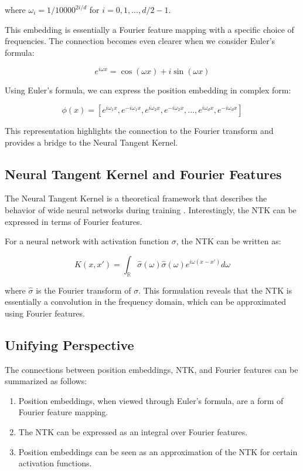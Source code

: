 \documentclass{article}
\begin{document}
where $\omega_i = 1/10000^{2i/d}$ for $i = 0, 1, ..., d/2 - 1$.

This embedding is essentially a Fourier feature mapping with a specific choice of frequencies. The connection becomes even clearer when we consider Euler's formula:

\begin{equation}
    e^{i\omega x} = \cos(\omega x) + i\sin(\omega x)
\end{equation}

Using Euler's formula, we can express the position embedding in complex form:

\begin{equation}
    \phi(x) = [e^{i\omega_1 x}, e^{-i\omega_1 x}, e^{i\omega_2 x}, e^{-i\omega_2 x}, ..., e^{i\omega_d x}, e^{-i\omega_d x}]
\end{equation}

This representation highlights the connection to the Fourier transform and provides a bridge to the Neural Tangent Kernel.

\subsection{Neural Tangent Kernel and Fourier Features}

The Neural Tangent Kernel is a theoretical framework that describes the behavior of wide neural networks during training \citep{Jacot2018}. Interestingly, the NTK can be expressed in terms of Fourier features.

For a neural network with activation function $\sigma$, the NTK can be written as:

\begin{equation}
    K(x, x') = \int_{\mathbb{R}} \hat{\sigma}(\omega) \hat{\sigma}(\omega) e^{i\omega(x-x')} d\omega
\end{equation}

where $\hat{\sigma}$ is the Fourier transform of $\sigma$. This formulation reveals that the NTK is essentially a convolution in the frequency domain, which can be approximated using Fourier features.

\subsection{Unifying Perspective}

The connections between position embeddings, NTK, and Fourier features can be summarized as follows:

\begin{enumerate}
    \item Position embeddings, when viewed through Euler's formula, are a form of Fourier feature mapping.
    \item The NTK can be expressed as an integral over Fourier features.
    \item Position embeddings can be seen as an approximation of the NTK for certain activation functions.
\end{enumerate}
\end{document}
